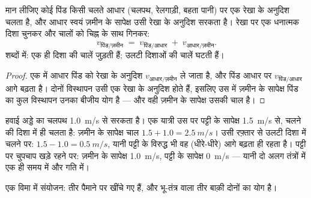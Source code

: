 \begin{proposition}[एक विमा में चालों का संयोजन]\label{prop:g10:relative-motion:compose}
मान लीजिए कोई पिंड किसी चलते आधार (चलपथ, रेलगाड़ी, बहता पानी) पर एक रेखा
के अनुदिश चलता है, और आधार स्वयं ज़मीन के सापेक्ष उसी रेखा के अनुदिश
सरकता है। रेखा पर एक धनात्मक दिशा चुनकर और चालों को चिह्न के साथ गिनकर:
\[
v_{\text{पिंड/ज़मीन}} \;=\; v_{\text{पिंड/आधार}} \;+\;
v_{\text{आधार/ज़मीन}} .
\]
शब्दों में: एक ही दिशा की चालें जुड़ती हैं; उलटी दिशाओं की चालें घटती
हैं।
\end{proposition}

\begin{proof}
एक  में आधार पिंड को रेखा के अनुदिश $v_{\text{आधार/ज़मीन}}$  ले जाता है,
और पिंड आधार पर $v_{\text{पिंड/आधार}}$  आगे बढ़ता है। दोनों विस्थापन उसी एक
रेखा के अनुदिश होते हैं, इसलिए उस  में ज़मीन के सापेक्ष पिंड का कुल
विस्थापन उनका बीजीय योग है --- और वही ज़मीन के सापेक्ष उसकी चाल है।
\end{proof}

\begin{example}[चलती पट्टी]\label{ex:g10:relative-motion:walkway}
हवाई अड्डे का चलपथ \qty{1.0}{m/s} से सरकता है। एक यात्री उस पर पट्टी के सापेक्ष
\qty{1.5}{m/s} से, चलने की दिशा में ही चलता है: ज़मीन के सापेक्ष चाल $1.5 + 1.0 = \qty{2.5}{m/s}$। उसी
रफ़्तार से उलटी दिशा में चलने पर: $1.5 - 1.0 = \qty{0.5}{m/s}$, यानी पट्टी के विरुद्ध भी वह
(धीरे-धीरे) आगे बढ़ता ही रहता है। पट्टी पर चुपचाप खड़े रहने पर: ज़मीन के
सापेक्ष \qty{1.0}{m/s}, पट्टी के सापेक्ष \qty{0}{m/s} --- यानी दो अलग तंत्रों में एक
ही समय  में और गति में।
\end{example}

\begin{omfigure}

{\small एक विमा में संयोजन: तीर पैमाने पर खींचे गए हैं, और भू-तंत्र वाला
तीर बाक़ी दोनों का योग है।}
\end{omfigure}

